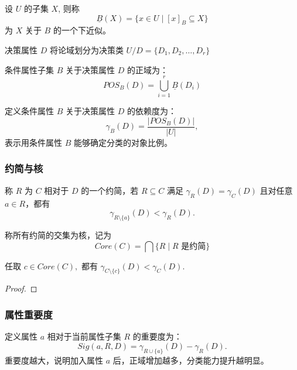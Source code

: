 \begin{definition}[下近似]
	设 $U$ 的子集 $X$, 则称 
	\[
	\underline{B}(X)=\{x\in U\mid [x]_B\subseteq X\}
	\]
	为 $X$ 关于 $B$ 的一个下近似。
\end{definition}

\begin{notation}
	决策属性 \(D\) 将论域划分为决策类 $U/D=\{D_1,D_2,\dots,D_r\}$
\end{notation}

\begin{definition}[正域]
	条件属性子集 \(B\) 关于决策属性 \(D\) 的正域为：
	\[
	POS_B(D)=\bigcup_{i=1}^{r}\underline{B}(D_i)
	\]
\end{definition}

\begin{definition}[依赖度]
	定义条件属性 $B$ 关于决策属性 $D$ 的依赖度为：
	\[
	\gamma_B(D)=\frac{|POS_B(D)|}{|U|},
	\]
	表示用条件属性 \(B\) 能够确定分类的对象比例。
\end{definition}

\subsubsection*{约简与核}

\begin{definition}[约简]
	称 \(R\) 为 \(C\) 相对于 \(D\) 的一个约简，若 \(R\subseteq C\) 满足 $\gamma_R(D)=\gamma_C(D)$ 且对任意 \(a\in R\)，都有  
	\[
	\gamma_{R\setminus\{a\}}(D)<\gamma_R(D).
	\]
\end{definition}

\begin{definition}[核]
	称所有约简的交集为核，记为
	\[
	Core(C)=\bigcap\{R\mid R\text{ 是约简}\}
	\]
\end{definition}

\begin{proposition}
	任取 $c\in Core(C),$ 都有 $\gamma_{C\setminus\{c\}}(D) < \gamma_C(D)$.
\end{proposition}
\begin{proof}
	
\end{proof}

\subsubsection*{属性重要度}
\begin{definition}
	定义属性 \(a\) 相对于当前属性子集 \(R\) 的重要度为：
	\[
	Sig(a,R,D)=\gamma_{R\cup\{a\}}(D)-\gamma_R(D).
	\]
	重要度越大，说明加入属性 \(a\) 后，正域增加越多，分类能力提升越明显。
\end{definition}